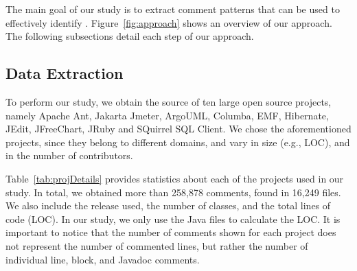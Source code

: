 The main goal of our study is to extract comment patterns that can be used to effectively identify \SADTD. Figure~\ref{fig:approach} shows an overview of our approach. The following subsections detail each step of our approach.
 
\subsection{Data Extraction}

To perform our study, we obtain the source of ten large open source projects, namely Apache Ant, Jakarta Jmeter, ArgoUML,  Columba, EMF, Hibernate, JEdit, JFreeChart, JRuby and SQuirrel SQL Client. We chose the aforementioned projects, since they belong to different domains, and vary in size (e.g., LOC), and in the number of contributors.

Table~\ref{tab:projDetails} provides statistics about each of the projects used in our study. In total, we obtained more than 258,878 comments, found in 16,249 files. We also include the release used, the number of classes, and the total lines of code (LOC). In our study, we only use the Java files to calculate the LOC. It is important to notice that the number of comments shown for each project does not represent the number of commented lines, but rather the number of individual line, block, and Javadoc comments. 




